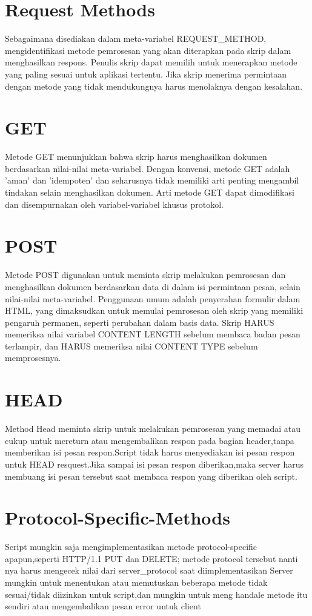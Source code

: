 \documentclass{article}
\begin{document}
\section{Request Methods}
Sebagaimana disediakan dalam meta-variabel REQUEST_METHOD, mengidentifikasi metode pemrosesan yang akan diterapkan pada skrip dalam menghasilkan respons. Penulis skrip dapat memilih untuk menerapkan metode yang paling sesuai untuk aplikasi tertentu. Jika skrip menerima permintaan dengan metode yang tidak mendukungnya harus menolaknya dengan kesalahan.
\section{GET}
Metode GET menunjukkan bahwa skrip harus menghasilkan dokumen berdasarkan nilai-nilai meta-variabel. Dengan konvensi, metode GET adalah 'aman' dan 'idempoten' dan seharusnya tidak memiliki arti penting mengambil tindakan selain menghasilkan dokumen.
Arti metode GET dapat dimodifikasi dan disempurnakan oleh variabel-variabel khusus protokol.
\section{POST}
Metode POST digunakan untuk meminta skrip melakukan pemrosesan dan menghasilkan dokumen berdasarkan data di dalam isi permintaan pesan, selain nilai-nilai meta-variabel. Penggunaan umum adalah penyerahan formulir dalam HTML, yang dimaksudkan untuk memulai pemrosesan oleh skrip yang memiliki pengaruh permanen, seperti perubahan dalam basis data.
Skrip HARUS memeriksa nilai variabel CONTENT LENGTH sebelum membaca badan pesan terlampir, dan HARUS memeriksa nilai CONTENT TYPE sebelum memprosesnya.
\section{HEAD}
Method Head meminta skrip untuk melakukan pemrosesan yang memadai atau cukup untuk mereturn atau mengembalikan respon pada bagian header,tanpa memberikan isi pesan respon.Script tidak harus menyediakan isi pesan respon untuk HEAD resquest.Jika sampai isi pesan respon diberikan,maka server harus membuang isi pesan tersebut saat membaca respon yang diberikan oleh script.
\section{Protocol-Specific-Methods}
Script mungkin saja mengimplementasikan metode protocol-specific apapun,seperti HTTP/1.1 PUT dan DELETE; metode protocol tersebut nanti nya harus mengecek nilai dari server_protocol saat diimplementasikan
Server mungkin untuk menentukan atau memutuskan beberapa metode tidak sesuai/tidak diizinkan untuk script,dan mungkin untuk meng handale metode itu sendiri atau mengembalikan pesan error untuk client
\end{document}
